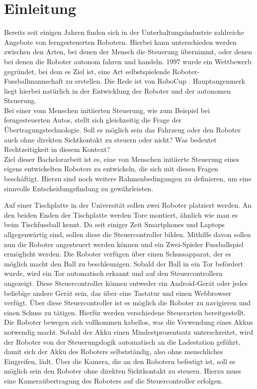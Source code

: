 \chapter{Einleitung}
\label{ch:einleitung}

Bereits seit einigen Jahren finden sich in der Unterhaltungsindustrie zahlreiche Angebote von ferngesteuerten Robotern. Hierbei kann unterschieden werden zwischen den Arten, bei denen der Mensch die Steuerung übernimmt, oder denen bei denen die Roboter autonom fahren und handeln. 1997 wurde ein Wettbewerb gegründet, bei dem es Ziel ist, eine Art selbstspielende Roboter-Fussballmannschaft zu erstellen. Die Rede ist von RoboCup \cite{ROBOCUP}. Hauptaugenmerk liegt hierbei natürlich in der Entwicklung der Roboter und der autonomen Steuerung. \\
Bei einer vom Menschen initiierten Steuerung, wie zum Beispiel bei ferngesteuerten Autos, stellt sich gleichzeitig die Frage der Übertragungstechnologie. Soll es möglich sein das Fahrzeug oder den Roboter auch ohne direkten Sichtkontakt zu steuern oder nicht? Was bedeutet Rechtzeitigkeit in diesem Kontext? \\
Ziel dieser Bachelorarbeit ist es, eine von Menschen initiierte Steuerung eines eigens entwickelten Roboters zu entwickeln, die sich mit diesen Fragen beschäftigt. Hierzu sind noch weitere Rahmenbedingungen zu definieren, um eine sinnvolle Entscheidungsfindung zu gewährleisten.


Auf einer Tischplatte in der Universität sollen zwei Roboter platziert werden. An den beiden Enden der Tischplatte werden Tore montiert, ähnlich wie man es beim Tischfussball kennt. Da seit einiger Zeit Smartphones und Laptops allgegenwärtig sind, sollen diese die Steuercontroller bilden. Mithilfe davon sollen nun die Roboter angesteuert werden können und ein Zwei-Spieler Fussballspiel ermöglicht werden. Die Roboter verfügen über einen Schussapparat, der es möglich macht den Ball zu beschleunigen. Sobald der Ball in ein Tor befördert wurde, wird ein Tor automatisch erkannt und auf den Steuercontrollern angezeigt. Diese Steuercontroller können entweder ein Android-Gerät oder jedes beliebige andere Gerät sein, das über eine Tastatur und einen Webbrowser verfügt. Über diese Steuercontroller ist es möglich die Roboter zu navigieren und einen Schuss zu tätigen. Hierfür werden verschiedene Steuerarten bereitgestellt. 
Die Roboter bewegen sich vollkommen kabellos, was die Verwendung eines Akkus notwendig macht. Sobald der Akku einen Mindestprozentsatz unterschreitet, wird der Roboter von der Steuerungslogik automatisch an die Ladestation geführt, damit sich der Akku des Roboters selbstständig, also ohne menschliches Eingreifen, lädt. Über die Kamera, die an den Robotern befestigt ist, soll es möglich sein den Roboter ohne direkten Sichtkontakt zu steuern. Hierzu muss eine Kameraübertragung des Roboters auf die Steuercontroller erfolgen.\\

